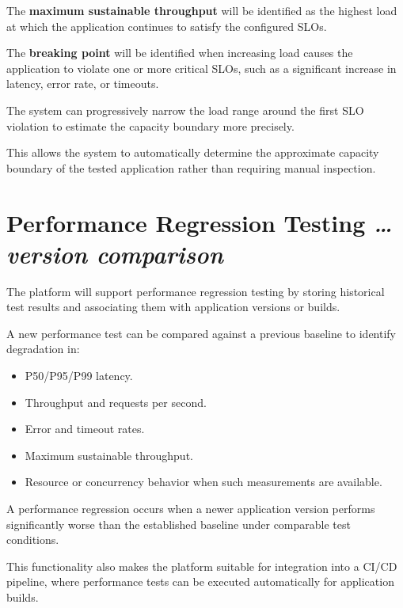 \documentclass[11pt,a4paper]{article}
\newcommand{\BvrHint}[1]{%
  {\normalfont\normalsize\itshape\hfill #1}}
\begin{document}
The \textbf{maximum sustainable throughput} will be identified as the
highest load at which the application continues to satisfy the
configured SLOs.

The \textbf{breaking point} will be identified when increasing load
causes the application to violate one or more critical SLOs, such as
a significant increase in latency, error rate, or timeouts.

The system can progressively narrow the load range around the first
SLO violation to estimate the capacity boundary more precisely.

This allows the system to automatically determine the approximate
capacity boundary of the tested application rather than requiring
manual inspection.

\section{Performance Regression Testing%
  \BvrHint{\ldots version comparison}}

The platform will support performance regression testing by storing
historical test results and associating them with application
versions or builds.

A new performance test can be compared against a previous baseline
to identify degradation in:

\begin{itemize}[leftmargin=0.7cm]

    \item P50/P95/P99 latency.

    \item Throughput and requests per second.

    \item Error and timeout rates.

    \item Maximum sustainable throughput.

    \item Resource or concurrency behavior when such measurements are
    available.

\end{itemize}

A performance regression occurs when a newer application version
performs significantly worse than the established baseline under
comparable test conditions.

This functionality also makes the platform suitable for integration
into a CI/CD pipeline, where performance tests can be executed
automatically for application builds.
\end{document}
